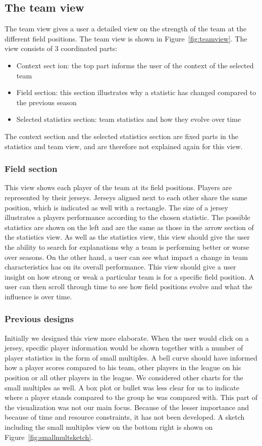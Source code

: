 \documentclass[]{sigchi}
\begin{document}
\subsection{The team view}
The team view gives a user a detailed view on the strength of the team at the 
different field positions. The team view is shown in Figure~\ref{fig:teamview}. 
The view consists of 3 coordinated parts:
\begin{itemize}
    \item Context sect
    ion: the top part informs the user of the context of the
        selected team
    \item Field section: this section illustrates why a statistic has changed
        compared to the previous season
    \item Selected statistics section: team statistics and how they evolve over
        time
\end{itemize}
The context section and the selected statistics section are fixed parts in the 
statistics and team view, and are therefore not explained again for this view.

\subsubsection{Field section}
This view shows each player of the team at its field positions. Players are
represented by their jerseys. Jerseys aligned next to each other share the same
position, which is indicated as well with a rectangle. The size of a jersey illustrates a
players performance according to the chosen statistic. The possible statistics 
are shown on the left and are the same as those in the arrow section of the 
statistics view. As well as the statistics view, this view should give the user 
the ability to search for explanations why a team is performing better or worse 
over seasons. On the other hand, a user can see what impact a change in team 
characteristics has on its overall performance. This view should give a user 
insight on how strong or weak a particular team is for a specific field position. 
A user can then scroll through time to see how field positions evolve and what 
the influence is over time.

\subsubsection{Previous designs}
Initially we designed this view more elaborate. When the user would click on a
jersey, specific player information would be shown together with a number of
player statistics in the form of small multiples. A bell curve should have
informed how a player scores compared to his team, other players in the league
on his position or all other players in the league. We considered other charts
for the small multiples as well. A box plot or bullet was less clear for us to
indicate where a player stands compared to the group he was compared with. This
part of the visualization was not our main focus. Because of the lesser
importance and because of time and resource constraints, it has not been
developed. A sketch including the small multiples view on the bottom right is
shown on Figure~\ref{fig:smallmultsketch}.
\end{document}
